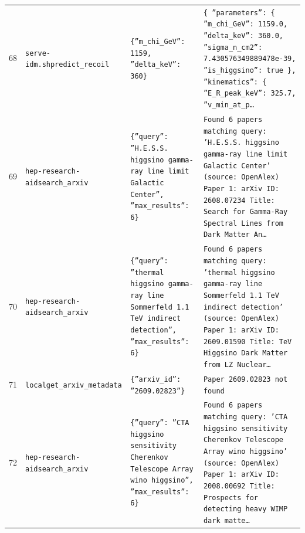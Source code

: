 \documentclass[11pt,a4paper]{article}
\begin{document}
\begin{longtable}{@{}p{}p{}p{}p{}@{}}
68 & \texttt{serve-idm.sh}\newline\texttt{predict\_\allowbreak{}recoil} & \texttt{\{''m\_\allowbreak{}chi\_\allowbreak{}GeV'':\allowbreak{} 1159,\allowbreak{} ''delta\_\allowbreak{}keV'':\allowbreak{} 360\}\allowbreak{}} & \texttt{\{   ''parameters'':\allowbreak{} \{     ''m\_\allowbreak{}chi\_\allowbreak{}GeV'':\allowbreak{} 1159.0,\allowbreak{}     ''delta\_\allowbreak{}keV'':\allowbreak{} 360.0,\allowbreak{}     ''sigma\_\allowbreak{}n\_\allowbreak{}cm2'':\allowbreak{} 7.430576349889478e-39,\allowbreak{}     ''is\_\allowbreak{}higgsino'':\allowbreak{} true   \}\allowbreak{},\allowbreak{}   ''kinematics'':\allowbreak{} \{     ''E\_\allowbreak{}R\_\allowbreak{}peak\_\allowbreak{}keV'':\allowbreak{} 325.7,\allowbreak{}     ''v\_\allowbreak{}min\_\allowbreak{}at\_\allowbreak{}p\ldots{}\allowbreak{}} \\
69 & \texttt{hep-research-aid}\newline\texttt{search\_\allowbreak{}arxiv} & \texttt{\{''query'':\allowbreak{} ''H.E.S.S. higgsino gamma-ray line limit Galactic Center'',\allowbreak{} ''max\_\allowbreak{}results'':\allowbreak{} 6\}\allowbreak{}} & \texttt{Found 6 papers matching query:\allowbreak{} 'H.E.S.S. higgsino gamma-ray line limit Galactic Center' (source:\allowbreak{} OpenAlex)\allowbreak{}  Paper 1:\allowbreak{} arXiv ID:\allowbreak{} 2608.07234 Title:\allowbreak{} Search for Gamma-Ray Spectral Lines from Dark Matter An\ldots{}\allowbreak{}} \\
70 & \texttt{hep-research-aid}\newline\texttt{search\_\allowbreak{}arxiv} & \texttt{\{''query'':\allowbreak{} ''thermal higgsino gamma-ray line Sommerfeld 1.1 TeV indirect detection'',\allowbreak{} ''max\_\allowbreak{}results'':\allowbreak{} 6\}\allowbreak{}} & \texttt{Found 6 papers matching query:\allowbreak{} 'thermal higgsino gamma-ray line Sommerfeld 1.1 TeV indirect detection' (source:\allowbreak{} OpenAlex)\allowbreak{}  Paper 1:\allowbreak{} arXiv ID:\allowbreak{} 2609.01590 Title:\allowbreak{} TeV Higgsino Dark Matter from LZ Nuclear\ldots{}\allowbreak{}} \\
71 & \texttt{local}\newline\texttt{get\_\allowbreak{}arxiv\_\allowbreak{}metadata} & \texttt{\{''arxiv\_\allowbreak{}id'':\allowbreak{} ''2609.02823''\}\allowbreak{}} & \texttt{Paper 2609.02823 not found} \\
72 & \texttt{hep-research-aid}\newline\texttt{search\_\allowbreak{}arxiv} & \texttt{\{''query'':\allowbreak{} ''CTA higgsino sensitivity Cherenkov Telescope Array wino higgsino'',\allowbreak{} ''max\_\allowbreak{}results'':\allowbreak{} 6\}\allowbreak{}} & \texttt{Found 6 papers matching query:\allowbreak{} 'CTA higgsino sensitivity Cherenkov Telescope Array wino higgsino' (source:\allowbreak{} OpenAlex)\allowbreak{}  Paper 1:\allowbreak{} arXiv ID:\allowbreak{} 2008.00692 Title:\allowbreak{} Prospects for detecting heavy WIMP dark matte\ldots{}\allowbreak{}} \\

\end{longtable}
\end{document}
